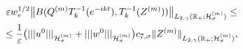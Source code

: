 \begin{lemma}[4]
\begin{multline}
\varepsilon w_e^{1/2} \bigl\| B(Q^{(m)}T^{-1}_{k}(e^{-ikt}),T^{-1}_{k}(Z^{(m)}))\bigr\|_{L_{2,\gamma}(\mathbb R_{+};{\cal H}^{(m)}_{\sigma})} \le   

\\

\le \frac{1}{\varepsilon} \bigl(|||u^0|||_{{\cal H}^{(m)}_{\sigma}}+|||w^0|||_{{\cal H}^{(m)}_{\sigma}} \bigr) c_{7,\sigma} \|Z^{(m)} \|_{L_{2,\gamma}(\mathbb R_{+};{\cal H}^{(m)}_{\sigma})},

\label{duh:estBQz}

\end{multline}

\end{lemma}



\smallskip



